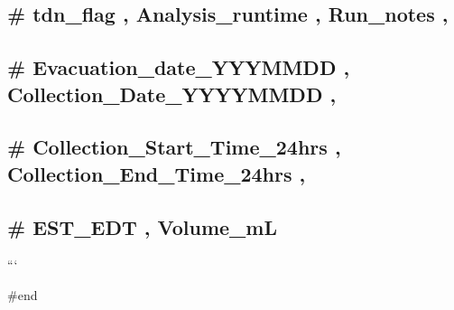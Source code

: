 \documentclass[
]{article}
\begin{document}
\hypertarget{tdn_flag-analysis_runtime-run_notes}{%
\subsection{\# tdn\_flag , Analysis\_runtime , Run\_notes
,}\label{tdn_flag-analysis_runtime-run_notes}}

\hypertarget{evacuation_date_yyymmdd-collection_date_yyyymmdd}{%
\subsection{\# Evacuation\_date\_YYYMMDD , Collection\_Date\_YYYYMMDD
,}\label{evacuation_date_yyymmdd-collection_date_yyyymmdd}}

\hypertarget{collection_start_time_24hrs-collection_end_time_24hrs}{%
\subsection{\# Collection\_Start\_Time\_24hrs ,
Collection\_End\_Time\_24hrs
,}\label{collection_start_time_24hrs-collection_end_time_24hrs}}

\hypertarget{est_edt-volume_ml}{%
\subsection{\texorpdfstring{\# EST\_EDT , Volume\_mL
}{\# EST\_EDT , Volume\_mL }}\label{est_edt-volume_ml}}

```

\#end
\end{document}
